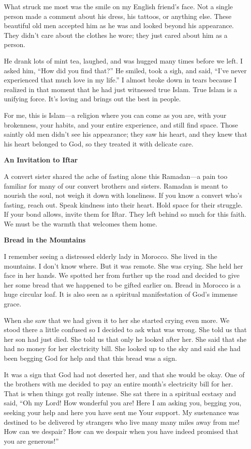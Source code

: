 \documentclass[11pt,twoside,openany]{book}
\newcommand{\piecehead}[1]{%
  \Needspace{6\baselineskip}%
  \par\addvspace{1.2\baselineskip}%
  {\noindent\large\bfseries #1\par}%
  \vspace{-0.15\baselineskip}%
}
\begin{document}
What struck me most was the smile on my English friend's face. Not a single person made a comment about his dress, his tattoos, or anything else. These beautiful old men accepted him as he was and looked beyond his appearance. They didn't care about the clothes he wore; they just cared about him as a person.

He drank lots of mint tea, laughed, and was hugged many times before we left. I asked him, ``How did you find that?'' He smiled, took a sigh, and said, ``I've never experienced that much love in my life.'' I almost broke down in tears because I realized in that moment that he had just witnessed true Islam. True Islam is a unifying force. It's loving and brings out the best in people.

For me, this is Islam---a religion where you can come as you are, with your brokenness, your habits, and your entire experience, and still find space. Those saintly old men didn't see his appearance; they saw his heart, and they knew that his heart belonged to God, so they treated it with delicate care.

\piecehead{An Invitation to Iftar}
A convert sister shared the ache of fasting alone this Ramadan---a pain too familiar for many of our convert brothers and sisters. Ramadan is meant to nourish the soul, not weigh it down with loneliness. If you know a convert who's fasting, reach out. Speak kindness into their heart. Hold space for their struggle. If your bond allows, invite them for Iftar. They left behind so much for this faith. We must be the warmth that welcomes them home.

\piecehead{Bread in the Mountains}
I remember seeing a distressed elderly lady in Morocco. She lived in the mountains. I don't know where. But it was remote. She was crying. She held her face in her hands. We spotted her from further up the road and decided to give her some bread that we happened to be gifted earlier on. Bread in Morocco is a huge circular loaf. It is also seen as a spiritual manifestation of God's immense grace.

When she saw that we had given it to her she started crying even more. We stood there a little confused so I decided to ask what was wrong. She told us that her son had just died. She told us that only he looked after her. She said that she had no money for her electricity bill. She looked up to the sky and said she had been begging God for help and that this bread was a sign.

It was a sign that God had not deserted her, and that she would be okay. One of the brothers with me decided to pay an entire month's electricity bill for her. That is when things got really intense. She sat there in a spiritual ecstasy and said, ``Oh my Lord! How wonderful you are! Here I am asking you, begging you, seeking your help and here you have sent me Your support. My sustenance was destined to be delivered by strangers who live many many miles away from me! How can we despair? How can we despair when you have indeed promised that you are generous!''
\end{document}
